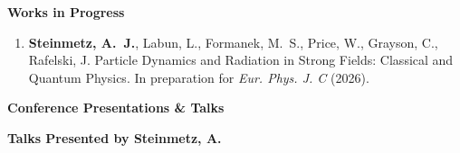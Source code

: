 \documentclass[11pt]{article}
\begin{document}
\medskip

{\large\textbf{Works in Progress}}

\begin{enumerate}[leftmargin=*,nosep]
    \item \textbf{Steinmetz, A.~J.}, Labun, L., Formanek, M.~S., Price, W., Grayson, C., Rafelski, J. Particle Dynamics and Radiation in Strong Fields: Classical and Quantum Physics. In preparation for \textit{Eur. Phys. J. C} (2026).
\end{enumerate}

\medskip

{\Large\textbf{Conference Presentations \& Talks}}

{\large\textbf{Talks Presented by Steinmetz, A.}}
\end{document}
